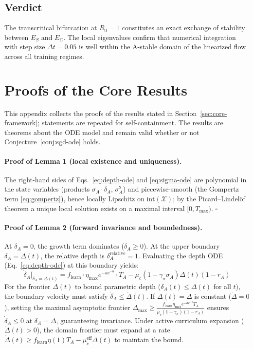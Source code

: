 \documentclass{article}
\theoremstyle{definition}
\begin{document}
\subsection{Verdict}

The transcritical bifurcation at $R_0 = 1$ constitutes an exact exchange of stability between $E_S$ and $E_C$. The local eigenvalues confirm that numerical integration with step size $\Delta t = 0.05$ is well within the A-stable domain of the linearized flow across all training regimes.


\clearpage
\section{Proofs of the Core Results}\label{app:proofs}

This appendix collects the proofs of the results stated in
Section~\ref{sec:core-framework}; statements are repeated for
self-containment. The results are theorems about the ODE model and
remain valid whether or not Conjecture~\ref{conj:sgd-ode} holds.

\paragraph*{Proof of Lemma 1 (local existence and uniqueness).}
The right-hand sides of Eqs.~\eqref{eq:depth-ode} and
\eqref{eq:sigma-ode} are polynomial in the state variables (products
$\sigma_A \cdot \delta_A$, $\sigma_A^2$) and piecewise-smooth (the
Gompertz term \eqref{eq:gompertz}), hence locally Lipschitz on
$\text{int}(\mathcal{X})$; by the Picard--Lindel\"of theorem a unique
local solution exists on a maximal interval $[0, T_{\max})$.
$\square$

\paragraph*{Proof of Lemma 2 (forward invariance and boundedness).}
At $\delta_A = 0$, the growth term dominates ($\dot{\delta}_A \ge 0$). At the upper boundary $\delta_A = \Delta(t)$, the relative depth is $\delta_A^{\text{relative}} = 1$. Evaluating the depth ODE (Eq.~\eqref{eq:depth-ode}) at this boundary yields:
\begin{equation}
\dot{\delta}_A\big|_{\delta_A = \Delta(t)} = f_{\text{learn}} \cdot \eta_{\max} e^{-a e^{-b}} \cdot T_A - \mu_c (1 - \gamma_\sigma \sigma_A) \Delta(t) (1 - r_A)
\end{equation}
For the frontier $\Delta(t)$ to bound parametric depth ($\delta_A(t) \le \Delta(t)$ for all $t$), the boundary velocity must satisfy $\dot{\delta}_A \le \dot{\Delta}(t)$. If $\Delta(t) = \Delta$ is constant ($\dot{\Delta} = 0$), setting the maximal asymptotic frontier $\Delta_{\max} \ge \frac{f_{\text{learn}} \eta_{\max} e^{-a e^{-b}} T_A}{\mu_c (1 - \gamma_\sigma)(1 - r_A)}$ ensures $\dot{\delta}_A \le 0$ at $\delta_A = \Delta$, guaranteeing invariance. Under active curriculum expansion ($\dot{\Delta}(t) > 0$), the domain frontier must expand at a rate $\dot{\Delta}(t) \ge f_{\text{learn}} \eta(1) T_A - \mu_c^{\text{eff}} \Delta(t)$ to maintain the bound. 
\end{document}
